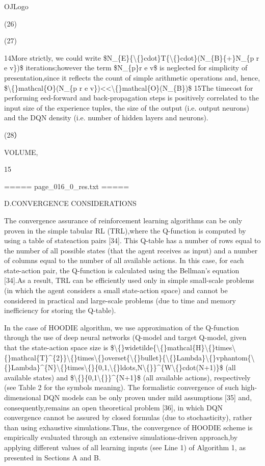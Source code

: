 \documentclass{article}
\begin{document}
OJLogo

(26)

(27)

14More strictly, we could write \$N\_\{E\}\{\textbackslash\{\}cdot\}T\{\textbackslash\{\}cdot\}(N\_\{B\}\{+\}N\_\{p r e v\})\$ iterations;however the term \$N\_\{p\}r e v\$ is neglected for simplicity of presentation,since it reflects the count of simple arithmetic operations and, hence,
\$\textbackslash\{\}mathcal\{O\}(N\_\{p r e v\})<<\textbackslash\{\}mathcal\{O\}(N\_\{B\})\$ 
15The timecost for performing eed-forward and back-propagation steps is positively correlated to the input size of the experience tuples, the size of the output (i.e. output neurons) and the DQN density (i.e. number of hidden layers and neurons).

(28）

VOLUME,

15

===== page\_016\_0\_res.txt =====


D.CONVERGENCE CONSIDERATIONS

The convergence assurance of reinforcement learning algorithms can be only proven in the simple tabular RL (TRL),where the Q-function is computed by using a table of stateaction pairs [34]. This Q-table has a number of rows equal to the number of all possible states (that the agent receives as input) and a number of columns equal to the number of all available actions. In this case, for each state-action pair, the Q-function is calculated using the Bellman's equation [34].As a result, TRL can be efficiently used only in simple small-scale problems (in which the agent considers a small state-action space) and cannot be considered in practical and large-scale problems (due to time and memory inefficiency for storing the Q-table).

In the case of HOODIE algorithm, we use approximation of the Q-function through the use of deep neural networks (Q-model and target Q-model, given that the state-action space size is \$\textbackslash\{\}widetilde\{\textbackslash\{\}mathcal\{H\}\textbackslash\{\}times\textbackslash\{\}mathcal\{T\}\textasciicircum{}\{2\}\}\textbackslash\{\}times\textbackslash\{\}overset\{\textbackslash\{\}bullet\}\{\textbackslash\{\}Lambda\}\textbackslash\{\}vphantom\{\textbackslash\{\}Lambda\}\textasciicircum{}\{N\}\textbackslash\{\}times\textbackslash\{\}\{0,1,\textbackslash\{\}ldots,N\textbackslash\{\}\}\textasciicircum{}\{W\textbackslash\{\}cdot(N+1)\}\$ (all available states) and \$\textbackslash\{\}\{0,1\textbackslash\{\}\}\textasciicircum{}\{N+1\}\$ (all available actions), respectively (see Table 2 for the symbols meaning). The formalistic convergence of such high-dimensional DQN models can be only proven under mild assumptions [35] and, consequently,remains an open theoretical problem [36], in which DQN convergence cannot be assured by closed formulas (due to stochasticity), rather than using exhaustive simulations.Thus, the convergence of HOODIE scheme is empirically evaluated through an extensive simulations-driven approach,by applying different values of all learning inputs (see Line 1) of Algorithm 1, as presented in Sections A and B.
\end{document}
